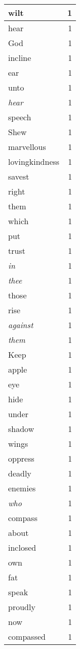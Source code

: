 \begin{center}
\begin{longtable}{l|r}
wilt & 1 \\ \hline
hear & 1 \\ \hline
God & 1 \\ \hline
incline & 1 \\ \hline
ear & 1 \\ \hline
unto & 1 \\ \hline
\emph{hear} & 1 \\ \hline
speech & 1 \\ \hline
Shew & 1 \\ \hline
marvellous & 1 \\ \hline
lovingkindness & 1 \\ \hline
savest & 1 \\ \hline
right & 1 \\ \hline
them & 1 \\ \hline
which & 1 \\ \hline
put & 1 \\ \hline
trust & 1 \\ \hline
\emph{in} & 1 \\ \hline
\emph{thee} & 1 \\ \hline
those & 1 \\ \hline
rise & 1 \\ \hline
\emph{against} & 1 \\ \hline
\emph{them} & 1 \\ \hline
Keep & 1 \\ \hline
apple & 1 \\ \hline
eye & 1 \\ \hline
hide & 1 \\ \hline
under & 1 \\ \hline
shadow & 1 \\ \hline
wings & 1 \\ \hline
oppress & 1 \\ \hline
deadly & 1 \\ \hline
enemies & 1 \\ \hline
\emph{who} & 1 \\ \hline
compass & 1 \\ \hline
about & 1 \\ \hline
inclosed & 1 \\ \hline
own & 1 \\ \hline
fat & 1 \\ \hline
speak & 1 \\ \hline
proudly & 1 \\ \hline
now & 1 \\ \hline
compassed & 1 \\ \hline

\end{longtable}
\end{center}
